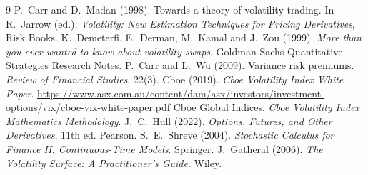 \documentclass[12pt]{article}
\begin{document}
\begin{thebibliography}{9}
 P.~Carr and D.~Madan (1998). Towards a theory of volatility trading. In R.~Jarrow (ed.), \emph{Volatility: New Estimation Techniques for Pricing Derivatives}, Risk Books.
 K.~Demeterfi, E.~Derman, M.~Kamal and J.~Zou (1999). \emph{More than you ever wanted to know about volatility swaps}. Goldman Sachs Quantitative Strategies Research Notes.
 P.~Carr and L.~Wu (2009). Variance risk premiums. \emph{Review of Financial Studies}, 22(3).
 Cboe (2019). \emph{Cboe Volatility Index White Paper}. \url{https://www.asx.com.au/content/dam/asx/investors/investment-options/vix/cboe-vix-white-paper.pdf}
 Cboe Global Indices. \emph{Cboe Volatility Index Mathematics Methodology}.
 J.~C.~Hull (2022). \emph{Options, Futures, and Other Derivatives}, 11th ed. Pearson.
 S.~E.~Shreve (2004). \emph{Stochastic Calculus for Finance II: Continuous-Time Models}. Springer.
 J.~Gatheral (2006). \emph{The Volatility Surface: A Practitioner's Guide}. Wiley.
\end{thebibliography}
\end{document}
